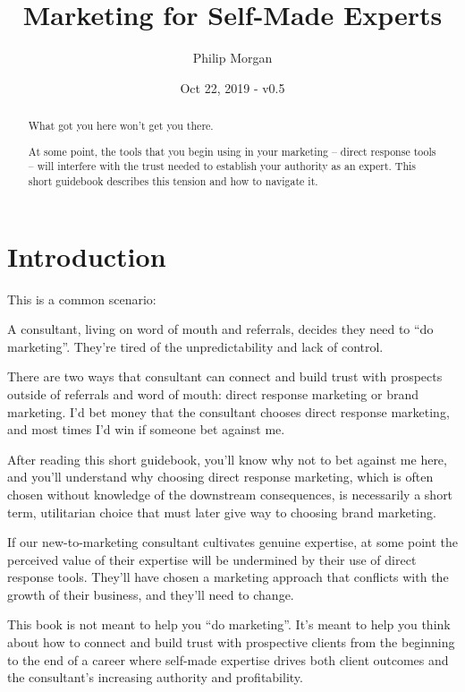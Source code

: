 \documentclass[13pt,]{tufte-handout}
\title{Marketing for Self-Made Experts}
\author{Philip Morgan}
\date{Oct 22, 2019 - v0.5}
\begin{document}
\maketitle

\begin{abstract}
\noindent What got you here won't get you there.

At some point, the tools that you begin using in your marketing --
direct response tools -- will interfere with the trust needed to
establish your authority as an expert. This short guidebook describes
this tension and how to navigate it.
\end{abstract}


{
\hypersetup{linkcolor=black}
\setcounter{tocdepth}{3}
\tableofcontents
}

\hypertarget{introduction}{%
\section{Introduction}\label{introduction}}

This is a common scenario:

A consultant, living on word of mouth and referrals, decides they need
to ``do marketing''. They're tired of the unpredictability and lack of
control.

There are two ways that consultant can connect and build trust with
prospects outside of referrals and word of mouth: direct response
marketing or brand marketing. I'd bet money that the consultant chooses
direct response marketing, and most times I'd win if someone bet against
me.

After reading this short guidebook, you'll know why not to bet against
me here, and you'll understand why choosing direct response marketing,
which is often chosen without knowledge of the downstream consequences,
is necessarily a short term, utilitarian choice that must later give way
to choosing brand marketing.

If our new-to-marketing consultant cultivates genuine expertise, at some
point the perceived value of their expertise will be undermined by their
use of direct response tools. They'll have chosen a marketing approach
that conflicts with the growth of their business, and they'll need to
change.

This book is not meant to help you ``do marketing''. It's meant to help
you think about how to connect and build trust with prospective clients
from the beginning to the end of a career where self-made expertise
drives both client outcomes and the consultant's increasing authority
and profitability.
\end{document}
